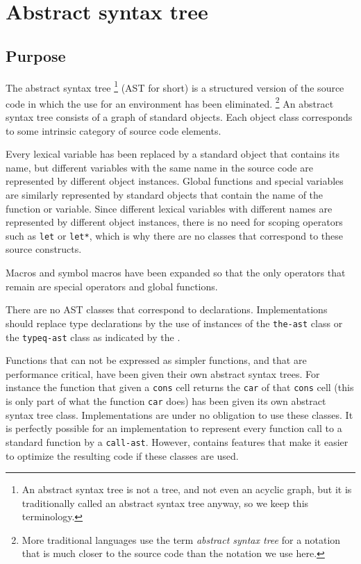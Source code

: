 \chapter{Abstract syntax tree}
\label{chap-abstract-syntax-tree}

\section{Purpose}

The abstract syntax tree%
\footnote{An abstract syntax tree is not a tree, and not even an
  acyclic graph, but it is traditionally called an abstract syntax
  tree anyway, so we keep this terminology.}  (AST for short) is a
structured version of the source code in which the use for an
environment has been eliminated.%
\footnote{More traditional languages use the term \emph{abstract
    syntax tree} for a notation that is much closer to the source code
  than the notation we use here.}
An abstract syntax tree consists of a graph of standard objects.  Each
object class corresponds to some intrinsic category of source code
elements.

Every lexical variable has been replaced by a standard object that
contains its name, but different variables with the same name in the
source code are represented by different object instances.  Global
functions and special variables are similarly represented by standard
objects that contain the name of the function or variable.  Since
different lexical variables with different names are represented by
different object instances, there is no need for scoping operators
such as \texttt{let} or \texttt{let*}, which is why there are no
classes that correspond to these source constructs.

Macros and symbol macros have been expanded so that the only operators
that remain are special operators and global functions.  

There are no AST classes that correspond to declarations.
Implementations should replace type declarations by the use of
instances of the \texttt{the-ast} class or the \texttt{typeq-ast}
class as indicated by the \hs{}.

Functions that can not be expressed as simpler functions, and that are
performance critical, have been given their own abstract syntax trees.
For instance the function that given a \texttt{cons} cell returns the
\texttt{car} of that \texttt{cons} cell (this is only part of what the
\commonlisp{} function \texttt{car} does) has been given its own abstract
syntax tree class.  Implementations are under no obligation to use
these classes.  It is perfectly possible for an implementation to
represent every function call to a standard \commonlisp{} function by a
\texttt{call-ast}.  However, \sysname{} contains features that make it
easier to optimize the resulting code if these classes are used.

